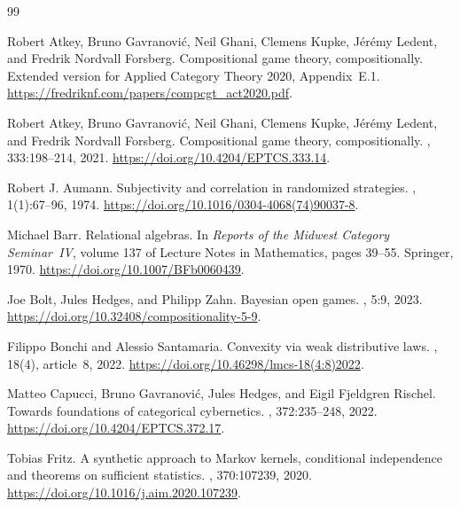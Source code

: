 \documentclass[11pt,a4paper]{article}
\theoremstyle{definition}
\begin{document}
\begin{thebibliography}{99}

    Robert Atkey, Bruno Gavranovi{\'c}, Neil Ghani, Clemens Kupke, J{\'e}r{\'e}my Ledent, and Fredrik {Nordvall Forsberg}. \newblock Compositional game theory, compositionally. \newblock Extended version for Applied Category Theory 2020, Appendix~E.1. \url{https://fredriknf.com/papers/compcgt_act2020.pdf}.

    Robert Atkey, Bruno Gavranovi{\'c}, Neil Ghani, Clemens Kupke, J{\'e}r{\'e}my Ledent, and Fredrik {Nordvall Forsberg}. \newblock Compositional game theory, compositionally. , 333:198--214, 2021. \newblock \url{https://doi.org/10.4204/EPTCS.333.14}.

    Robert J. Aumann. \newblock Subjectivity and correlation in randomized strategies. , 1(1):67--96, 1974. \newblock \url{https://doi.org/10.1016/0304-4068(74)90037-8}.

    Michael Barr. \newblock Relational algebras. \newblock In {\em Reports of the Midwest Category Seminar~IV}, volume 137 of Lecture Notes in Mathematics, pages 39--55. Springer, 1970. \newblock \url{https://doi.org/10.1007/BFb0060439}.

    Joe Bolt, Jules Hedges, and Philipp Zahn. \newblock Bayesian open games. , 5:9, 2023. \newblock \url{https://doi.org/10.32408/compositionality-5-9}.

    Filippo Bonchi and Alessio Santamaria. \newblock Convexity via weak distributive laws. , 18(4), article~8, 2022. \newblock \url{https://doi.org/10.46298/lmcs-18(4:8)2022}.

    Matteo Capucci, Bruno Gavranovi{\'c}, Jules Hedges, and Eigil Fjeldgren Rischel. \newblock Towards foundations of categorical cybernetics. , 372:235--248, 2022. \newblock \url{https://doi.org/10.4204/EPTCS.372.17}.

    Tobias Fritz. \newblock A synthetic approach to Markov kernels, conditional independence and theorems on sufficient statistics. , 370:107239, 2020. \newblock \url{https://doi.org/10.1016/j.aim.2020.107239}.


\end{thebibliography}
\end{document}
